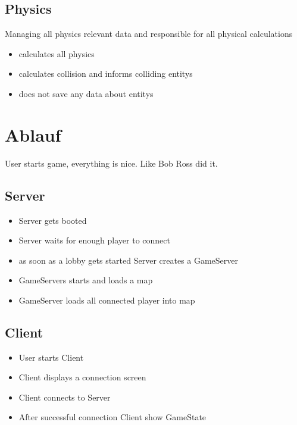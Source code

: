 \documentclass[parskip=full]{scrartcl}
\begin{document}
\subsection{Physics}
Managing all physics relevant data and responsible for all physical calculations
\begin{itemize}
	\item calculates all physics
	\item calculates collision and informs colliding entitys
	\item does not save any data about entitys
\end{itemize}
\section{Ablauf} %
User starts game, everything is nice. Like Bob Ross did it.

\subsection{Server}
\begin{itemize}
	\item Server gets booted
	\item Server waits for enough player to connect
	\item as soon as a lobby gets started Server creates a GameServer
	\item GameServers starts and loads a map
	\item GameServer loads all connected player into map
\end{itemize}


\subsection{Client}
\begin{itemize}
	\item User starts Client
	\item Client displays a connection screen
	\item Client connects to Server
	\item After successful connection Client show GameState
\end{itemize}
\end{document}

